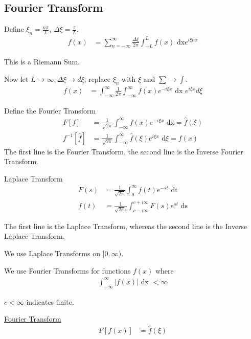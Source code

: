 \subsection{Fourier Transform}

Define $\xi_n = \frac{n \pi}{L}$, $\Delta \xi = \frac{\pi}{L}$.
%
\begin{align}
  f(x) & = \sum^\infty_{n = -\infty} \frac{\Delta \xi}{2 \pi} \int^L_{-L} f(x) \text{ dx} e^{i \xi n x}
\end{align}

This is a Riemann Sum.

Now let $L \to \infty, \Delta \xi \to d \xi$, replace $\xi_n$ with $\xi$ and $\sum \rightarrow \int$.
%
\begin{align}
  f(x) & = \int^\infty_{-\infty} \frac{1}{2 \pi} \int^\infty_{-\infty} f(x) e^{-i \xi x} \text{ dx } e^{i \xi x} d\xi
\end{align}

Define the Fourier Transform
%
\begin{align}
  F[f] & = \frac{1}{\sqrt {2 \pi}} \int^\infty_{- \infty} f(x) e^{-i \xi x} \text{ dx} = \hat f(\xi)\\
  f^{-1}[\hat f] & = \frac{1}{\sqrt{2 \pi}} \int^\infty_{- \infty} \hat f(\xi) e^{i \xi x} \text{ d}\xi = f(x)
\end{align}
The first line is the Fourier Transform, the second line is the Inverse Fourier Transform.

\note Laplace Transform
%
\begin{align}
  F(s) & = \frac{1}{\sqrt{2 \pi}} \int^\infty_0 f(t) e^{-st} \text{ dt}\\
  f(t) & = \frac{1}{\sqrt{2 \pi} i} \int^{c + i \infty}_{c - i\infty} F(s)e^{st} \text{ ds}
\end{align}

The first line is the Laplace Transform, whereas the second line is the Inverse Laplace Transform.

We use Laplace Transforms on $[0, \infty)$.

\note We use Fourier Transforms for functions $f(x)$ where
%
\begin{align}
  \int^\infty_{-\infty} |f(x)| \text{ dx } < \infty
\end{align}

\note $c < \infty$ indicates finite.

\newpage


\underline{Fourier Transform}
%
\begin{align}
  F[f(x)] & = \hat f(\xi)
\end{align}


